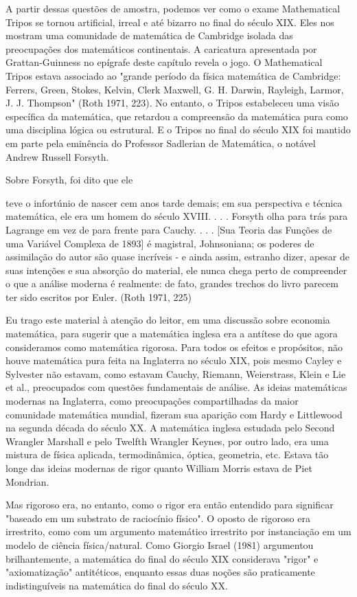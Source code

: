 \documentclass[12pt]{article}
\begin{document}
A partir dessas questões de amostra, podemos ver como o exame Mathematical Tripos se tornou artificial, irreal e até bizarro no final do século XIX. Eles nos mostram uma comunidade de matemática de Cambridge isolada das preocupações dos matemáticos continentais. A caricatura apresentada por Grattan-Guinness no epígrafe deste capítulo revela o jogo. O Mathematical Tripos estava associado ao "grande período da física matemática de Cambridge: Ferrers, Green, Stokes, Kelvin, Clerk Maxwell, G. H. Darwin, Rayleigh, Larmor, J. J. Thompson" (Roth 1971, 223). No entanto, o Tripos estabeleceu uma visão específica da matemática, que retardou a compreensão da matemática pura como uma disciplina lógica ou estrutural. E o Tripos no final do século XIX foi mantido em parte pela eminência do Professor Sadlerian de Matemática, o notável Andrew Russell Forsyth.

Sobre Forsyth, foi dito que ele

teve o infortúnio de nascer cem anos tarde demais; em sua perspectiva e técnica matemática, ele era um homem do século XVIII. . . . Forsyth olha para trás para Lagrange em vez de para frente para Cauchy. . . . [Sua Teoria das Funções de uma Variável Complexa de 1893] é magistral, Johnsoniana; os poderes de assimilação do autor são quase incríveis - e ainda assim, estranho dizer, apesar de suas intenções e sua absorção do material, ele nunca chega perto de compreender o que a análise moderna é realmente: de fato, grandes trechos do livro parecem ter sido escritos por Euler. (Roth 1971, 225)

Eu trago este material à atenção do leitor, em uma discussão sobre economia matemática, para sugerir que a matemática inglesa era a antítese do que agora consideramos como matemática rigorosa. Para todos os efeitos e propósitos, não houve matemática pura feita na Inglaterra no século XIX, pois mesmo Cayley e Sylvester não estavam, como estavam Cauchy, Riemann, Weierstrass, Klein e Lie et al., preocupados com questões fundamentais de análise. As ideias matemáticas modernas na Inglaterra, como preocupações compartilhadas da maior comunidade matemática mundial, fizeram sua aparição com Hardy e Littlewood na segunda década do século XX. A matemática inglesa estudada pelo Second Wrangler Marshall e pelo Twelfth Wrangler Keynes, por outro lado, era uma mistura de física aplicada, termodinâmica, óptica, geometria, etc. Estava tão longe das ideias modernas de rigor quanto William Morris estava de Piet Mondrian.

Mas rigoroso era, no entanto, como o rigor era então entendido para significar "baseado em um substrato de raciocínio físico". O oposto de rigoroso era irrestrito, como com um argumento matemático irrestrito por instanciação em um modelo de ciência física/natural. Como Giorgio Israel (1981) argumentou brilhantemente, a matemática do final do século XIX considerava "rigor" e "axiomatização" antitéticos, enquanto essas duas noções são praticamente indistinguíveis na matemática do final do século XX.
\end{document}

